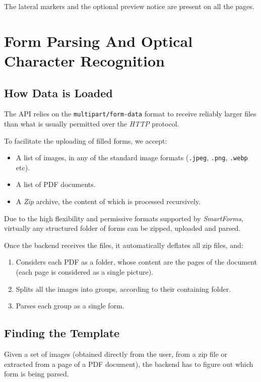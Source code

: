 \documentclass[12pt, a4paper]{report}
\def\code#1{\texttt{#1}}
\begin{document}
The lateral markers and the optional preview notice are present on all the pages.



\chapter{Form Parsing And Optical Character Recognition}

\section{How Data is Loaded}

The API relies on the \code{multipart/form-data}\cite{masinter1998rfc2388} format to receive reliably larger files than what is usually permitted over the \textit{HTTP} protocol.

To facilitate the uploading of filled forms, we accept:
\begin{itemize}
    \item A list of images, in any of the standard image formats (\code{.jpeg}, \code{.png}, \code{.webp} etc).
    \item A list of PDF documents.
    \item A \textit{Zip} archive, the content of which is processed recursively.
\end{itemize}

Due to the high flexibility and permissive formats supported by \textit{SmartForms}, virtually any structured folder of forms can be zipped, uploaded and parsed.

Once the backend receives the files, it automatically deflates all zip files, and:
\begin{enumerate}
    \item Considers each PDF as a folder, whose content are the pages of the document (each page is considered as a single picture).
    \item Splits all the images into groups, according to their containing folder.
    \item Parses each group as a single form.
\end{enumerate}

\section{Finding the Template}

Given a set of images (obtained directly from the user, from a zip file or extracted from a page of a PDF document), the backend has to figure out which form is being parsed.
\end{document}
